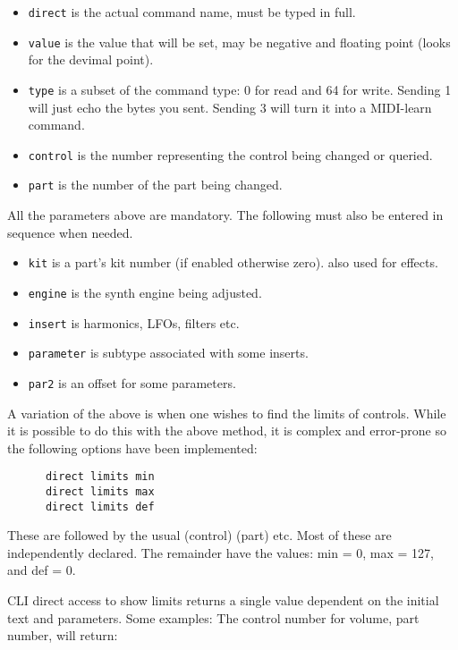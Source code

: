    \begin{itemize}
      \item \texttt{direct} is the actual command name, must be typed in full.
      \item \texttt{value} is the value that will be set, may be negative and
         floating point (looks for the devimal point).
      \item \texttt{type} is a subset of the command type: 0 for read and 64 for
         write. Sending 1 will just echo the bytes you sent.  Sending 3 will
         turn it into a MIDI-learn command.
      \item \texttt{control} is the number representing the control being
         changed or queried.
      \item \texttt{part} is the number of the part being changed.
   \end{itemize}

   All the parameters above are mandatory. The following must also be entered in
   sequence when needed.

   \begin{itemize}
      \item \texttt{kit} is a part's kit number (if enabled otherwise zero).
         also used for effects.
      \item \texttt{engine} is the synth engine being adjusted.
      \item \texttt{insert} is harmonics, LFOs, filters etc.
      \item \texttt{parameter} is subtype associated with some inserts.
      \item \texttt{par2} is an offset for some parameters.
   \end{itemize}

   A variation of the above is when one wishes to find the limits of controls.
   While it is possible to do this with the above method, it is complex and
   error-prone so the following options have been implemented:

   \begin{verbatim}
      direct limits min
      direct limits max
      direct limits def
   \end{verbatim}

   These are followed by the usual (control) (part) etc.  Most of these are independently declared. The remainder have the values: min = 0, max = 127, and def = 0.

   CLI direct access to show limits returns a single value dependent on the
   initial text and parameters.  Some examples:
   The control number for volume, part number, will return:

